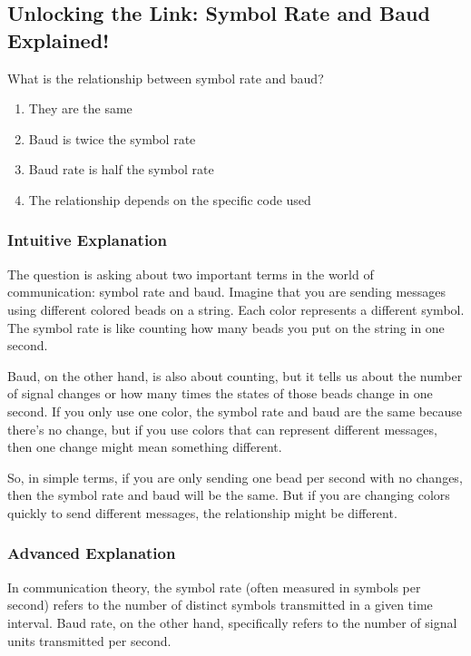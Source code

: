 \subsection{Unlocking the Link: Symbol Rate and Baud Explained!}

\begin{tcolorbox}[colback=yellow!10!white, colframe=yellow!80!black, title=Question ID: \textbf{E8C11}]
What is the relationship between symbol rate and baud?
\begin{enumerate}[label=\Alph*.]
    \item They are the same
    \item Baud is twice the symbol rate
    \item Baud rate is half the symbol rate
    \item The relationship depends on the specific code used
\end{enumerate}
\end{tcolorbox}

\subsubsection{Intuitive Explanation}
The question is asking about two important terms in the world of communication: symbol rate and baud. Imagine that you are sending messages using different colored beads on a string. Each color represents a different symbol. The symbol rate is like counting how many beads you put on the string in one second. 

Baud, on the other hand, is also about counting, but it tells us about the number of signal changes or how many times the states of those beads change in one second. If you only use one color, the symbol rate and baud are the same because there’s no change, but if you use colors that can represent different messages, then one change might mean something different.

So, in simple terms, if you are only sending one bead per second with no changes, then the symbol rate and baud will be the same. But if you are changing colors quickly to send different messages, the relationship might be different.

\subsubsection{Advanced Explanation}
In communication theory, the symbol rate (often measured in symbols per second) refers to the number of distinct symbols transmitted in a given time interval. Baud rate, on the other hand, specifically refers to the number of signal units transmitted per second. 

